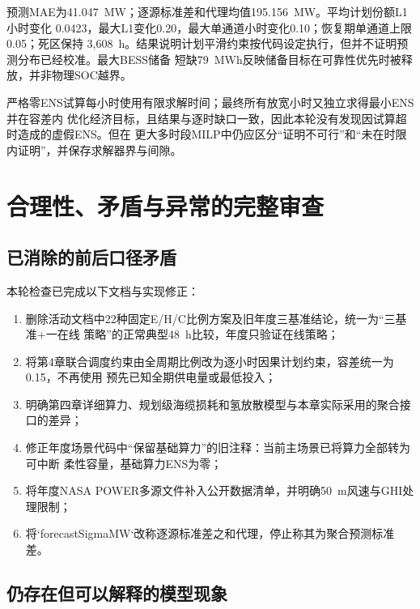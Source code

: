 预测MAE为41.047~MW；逐源标准差和代理均值195.156~MW。平均计划份额L1小时变化
0.0423，最大L1变化0.20，最大单通道小时变化0.10；恢复期单通道上限0.05；死区保持
3,608~h。结果说明计划平滑约束按代码设定执行，但并不证明预测分布已经校准。最大BESS储备
短缺79~MWh反映储备目标在可靠性优先时被释放，并非物理SOC越界。

严格零ENS试算每小时使用有限求解时间；最终所有放宽小时又独立求得最小ENS并在容差内
优化经济目标，且结果与逐时缺口一致，因此本轮没有发现因试算超时造成的虚假ENS。但在
更大多时段MILP中仍应区分“证明不可行”和“未在时限内证明”，并保存求解器界与间隙。

\section{合理性、矛盾与异常的完整审查}

\subsection{已消除的前后口径矛盾}

本轮检查已完成以下文档与实现修正：
\begin{enumerate}[label=(\arabic*)]
\item 删除活动文档中22种固定E/H/C比例方案及旧年度三基准结论，统一为“三基准+一在线
      策略”的正常典型48~h比较，年度只验证在线策略；
\item 将第4章联合调度约束由全周期比例改为逐小时因果计划约束，容差统一为0.15，不再使用
      预先已知全期供电量或最低投入；
\item 明确第四章详细算力、规划级海缆损耗和氢放散模型与本章实际采用的聚合接口的差异；
\item 修正年度场景代码中“保留基础算力”的旧注释：当前主场景已将算力全部转为可中断
      柔性容量，基础算力ENS为零；
\item 将年度NASA POWER多源文件补入公开数据清单，并明确50~m风速与GHI处理限制；
\item 将`forecastSigmaMW`改称逐源标准差之和代理，停止称其为聚合预测标准差。
\end{enumerate}

\subsection{仍存在但可以解释的模型现象}

